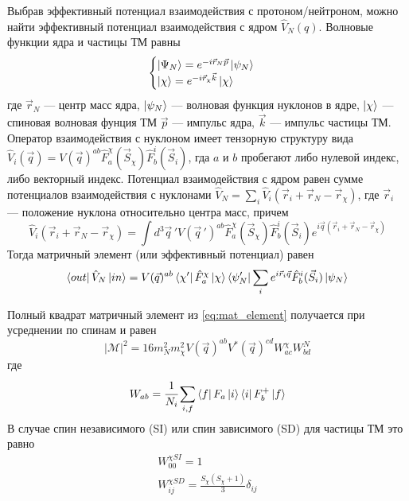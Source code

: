 Выбрав эффективный потенциал взаимодействия с протоном/нейтроном, можно найти эффективный потенциал взаимодействия с ядром $\hat{V}_{N}(q)$. Волновые функции ядра и частицы ТМ равны
\begin{equation}
	\begin{cases}
		\ket{\Psi_N} = e^{-i\vec{r}_N \vec{p}} \ket{\psi_N} \\
		\ket{\chi} = e^{-i\vec{r}_{\chi} \vec{k}} \ket{\chi} \\
	\end{cases}
\end{equation}
где $\vec{r}_N$ --- центр масс ядра, $\ket{\psi_N}$ --- волновая функция нуклонов в ядре, $\ket{\chi}$ --- спиновая волновая фунция ТМ $\vec{p}$ --- импульс ядра, $\vec{k}$ --- импульс частицы ТМ. Оператор взаимодействия с нуклоном имеет тензорную структуру вида $\hat{V}_{i}(\vec{q}) = V(\vec{q})^{ab} \hat{F}^{\chi}_a(\vec{S}_{\chi})\hat{F}^{i}_b(\vec{S}_{i})$, гда $a$ и $b$ пробегают либо нулевой индекс, либо векторный индекс. Потенциал взаимодействия с ядром равен сумме потенциалов взаимодействия с нуклонами $\hat{V}_{N} = \sum_i{\hat{V}_{i}(\vec{r}_i + \vec{r}_N - \vec{r}_{\chi})}$, где $\vec{r}_i$ --- положение нуклона относительно центра масс, причем 
\begin{equation}
	\hat{V}_{i}(\vec{r}_i + \vec{r}_N - \vec{r}_{\chi}) = 
	\int{d^3\vec{q}\,' V(\vec{q}\,')^{ab} \hat{F}^{\chi}_a(\vec{S}_{\chi})\hat{F}^{i}_b(\vec{S}_{i})} e^{i\vec{q}(\vec{r}_i + \vec{r}_N - \vec{r}_{\chi})}
\end{equation}
Тогда матричный элемент (или эффективный потенциал) равен 
\begin{equation}
\begin{split}
	\bra{out}\hat{V}_{N}\ket{in} = V(\vec{q})^{ab} \bra{\chi'}\hat{F}^{\chi}_a\ket{\chi} 
	\bra{\psi_N'} \sum_i{e^{i\vec{r}_i\vec{q}}} \hat{F}^{i}_b(\vec{S}_{i})\ket{\psi_N}
\end{split}
\end{equation}

Полный квадрат матричный элемент из \ref{eq:mat_element} получается при усреднении по спинам и равен
\begin{equation}
	|\mathcal{M}|^2 = 16 m_N^2 m_{\chi}^2 V(\vec{q})^{ab} V^*(\vec{q})^{cd} W^{\chi}_{ac} W^{N}_{bd}
\end{equation}
где
\begin{equation}
	W_{ab} = \cfrac{1}{N_i}\sum_{i,f}{\bra{f}F_a\ket{i}\bra{i}F^+_b\ket{f}} 
\end{equation}
В случае спин независимого (SI) или спин зависимого (SD) для частицы ТМ это равно
\begin{equation}
	\begin{split}
		W^{\chi SI}_{00} = 1 \\ 
		W^{\chi SD}_{ij} = \frac{S_{\chi}(S_{\chi}+1)}{3} \delta_{ij} \\
	\end{split}
\end{equation}

